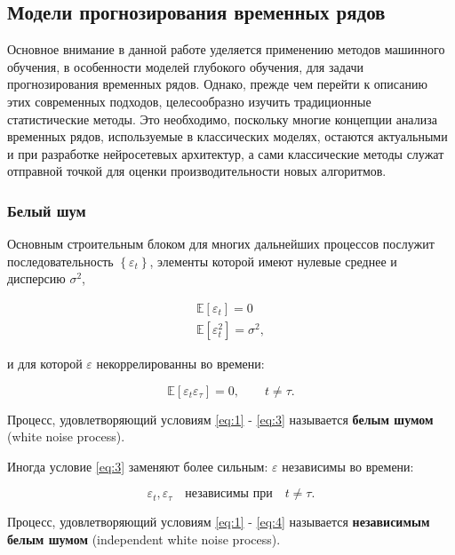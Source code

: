 \subsection{Модели прогнозирования временных рядов}

Основное внимание в данной работе уделяется применению методов 
машинного обучения, в особенности моделей глубокого обучения, 
для задачи прогнозирования временных рядов. Однако, прежде чем перейти к 
описанию этих современных подходов, целесообразно изучить традиционные 
статистические методы. Это необходимо, поскольку многие концепции 
анализа временных рядов, используемые в классических моделях, 
остаются актуальными и при разработке нейросетевых архитектур, а 
сами классические методы служат отправной точкой для оценки 
производительности новых алгоритмов.

\subsubsection{Белый шум}

Основным строительным блоком для многих дальнейших процессов 
послужит последовательность $\left\{ \varepsilon_t \right\}$, 
элементы которой имеют нулевые среднее и дисперсию $\sigma^2$,

\begin{gather}
    \mathbb{E}\left[ \varepsilon_t \right] = 0 \label{eq:1} \\
    \mathbb{E} \left[ \varepsilon_t^2 \right] = \sigma^2, \label{eq:2}
\end{gather}

и для которой $\varepsilon$ некоррелированны во времени:

\begin{equation}
    \mathbb{E} \left[ \varepsilon_t \varepsilon_\tau \right] = 0, \qquad t \neq \tau. \label{eq:3}
\end{equation}

Процесс, удовлетворяющий условиям \eqref{eq:1} - \eqref{eq:3} называется \textbf{белым шумом}
(white noise process).

Иногда условие \eqref{eq:3} заменяют более сильным: $\varepsilon$ 
независимы во времени:

\begin{equation}
    \varepsilon_t, \varepsilon_\tau \quad \text{независимы при} \quad t \neq \tau. \label{eq:4}
\end{equation}

Процесс, удовлетворяющий условиям \eqref{eq:1} - \eqref{eq:4} называется \textbf{независимым 
белым шумом} (independent white noise process).

